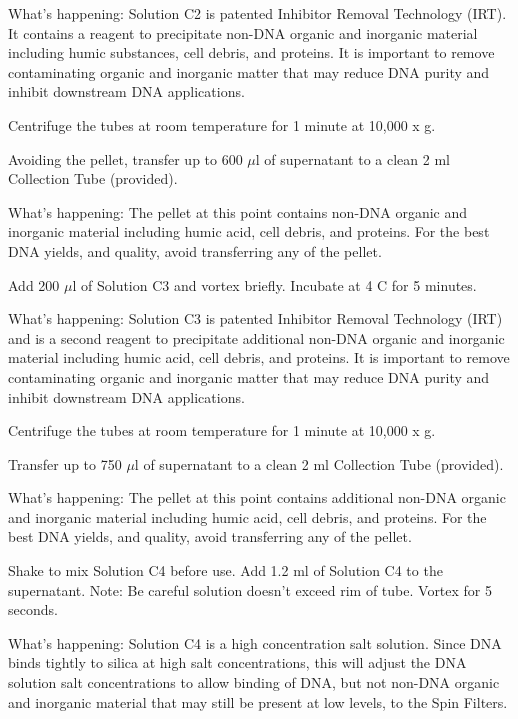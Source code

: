 \documentclass[12pt]{../SOP3_alpha}
\begin{document}
What's happening: Solution C2 is patented Inhibitor Removal Technology\textsuperscript{\textregistered} (IRT). It contains a reagent to precipitate non-DNA organic and inorganic material including humic substances, cell debris, and proteins. It is important to remove contaminating organic and inorganic matter that may reduce
DNA purity and inhibit downstream DNA applications.

\NP Centrifuge the tubes at room temperature for 1 minute at 10,000 x g.

\NP Avoiding the pellet, transfer up to 600 $\mu$l of supernatant to a clean 2 ml Collection Tube (provided).

\noindent What's happening: The pellet at this point contains non-DNA organic and inorganic material including humic acid, cell debris, and proteins. For the best DNA yields, and quality, avoid transferring any of the pellet.

\NP Add 200 $\mu$l of Solution C3 and vortex briefly. Incubate at 4 \degree C for 5 minutes.

\noindent What's happening: Solution C3 is patented Inhibitor Removal Technology\textsuperscript{\textregistered} (IRT) and is a second reagent to precipitate additional non-DNA organic and inorganic material including humic acid, cell debris, and proteins. It is important to remove contaminating organic and inorganic matter that may reduce DNA purity and inhibit downstream DNA applications.

\NP Centrifuge the tubes at room temperature for 1 minute at 10,000 x g.

\NP Transfer up to 750 $\mu$l of supernatant to a clean 2 ml Collection Tube (provided).

\noindent What's happening: The pellet at this point contains additional non-DNA organic and inorganic material including humic acid, cell debris, and proteins. For the best DNA yields, and quality, avoid transferring any of the pellet.

\NP Shake to mix Solution C4 before use. Add 1.2 ml of Solution C4 to the supernatant. Note: Be careful solution doesn't exceed rim of tube. Vortex for 5 seconds.

\noindent What's happening: Solution C4 is a high concentration salt solution. Since DNA binds tightly to silica at high salt concentrations, this will adjust the DNA solution salt concentrations to allow binding of DNA, but not non-DNA organic and inorganic material that may still be present at low levels, to the Spin Filters.
\end{document}
